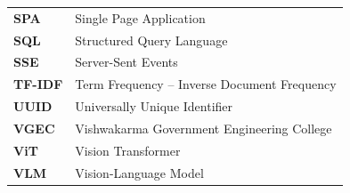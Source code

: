 \documentclass[12pt,a4paper,oneside]{report}
\begin{document}
\begin{longtable}{p{3.2cm} p{10.5cm}}
\textbf{SPA}    & Single Page Application \\
\textbf{SQL}    & Structured Query Language \\
\textbf{SSE}    & Server-Sent Events \\
\textbf{TF-IDF} & Term Frequency -- Inverse Document Frequency \\
\textbf{UUID}   & Universally Unique Identifier \\
\textbf{VGEC}   & Vishwakarma Government Engineering College \\
\textbf{ViT}    & Vision Transformer \\
\textbf{VLM}    & Vision-Language Model \\
\end{longtable}
\end{document}

